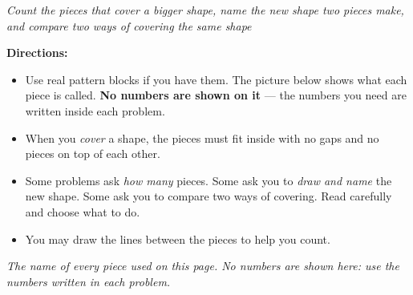 \documentclass[12pt]{article}
\begin{document}

\begin{center}\small\textit{Count the pieces that cover a bigger shape, name the new
shape two pieces make, and compare two ways of covering the same shape}\end{center}

\noindent\small\textbf{Directions:}
\begin{itemize}[label={$\bullet$}, leftmargin=1.1cm, itemsep=1pt, topsep=2pt]
  \item Use real pattern blocks if you have them. The picture below shows what each
        piece is called. \textbf{No numbers are shown on it} --- the numbers you need
        are written inside each problem.
  \item When you \emph{cover} a shape, the pieces must fit inside with no gaps and no
        pieces on top of each other.
  \item Some problems ask \emph{how many} pieces. Some ask you to \emph{draw and name}
        the new shape. Some ask you to compare two ways of covering. Read carefully and
        choose what to do.
  \item You may draw the lines between the pieces to help you count.
\end{itemize}
\normalsize

\begin{center}

\smallskip
{\small\textit{The name of every piece used on this page. No numbers are shown here:
use the numbers written in each problem.}}
\end{center}
\end{document}
